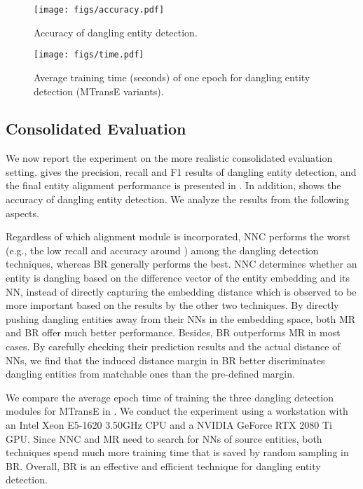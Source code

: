 \begin{figure}[t]
	\centering
	\texttt{[image: figs/accuracy.pdf]}
	\caption{Accuracy of dangling entity detection.}
	\label{fig:accuracy}
\end{figure}

\begin{figure}[t]
	\centering
	\texttt{[image: figs/time.pdf]}
	\caption{Average training time (seconds) of one epoch for dangling entity detection (MTransE variants).}
	\label{fig:time}
\end{figure}

\subsection{Consolidated Evaluation}\label{sec:consolidated}
We now report the experiment on the more realistic consolidated evaluation setting.
 gives the precision, recall and F1 results of dangling entity detection, and the final entity alignment performance is presented in . 
In addition,  shows the accuracy of dangling entity detection.
We analyze the results from the following aspects.

Regardless of which alignment module is incorporated,
NNC performs the worst (e.g., the low recall and accuracy around ) 
among the dangling detection techniques, whereas BR generally performs the best. 
NNC determines whether an entity is dangling based on the difference vector of the entity embedding and its NN, instead of directly capturing the embedding distance which is observed to be more important based on the results by the other two techniques.
By directly pushing dangling entities away from their NNs in the embedding space, both MR and BR offer much better performance. 
Besides, BR outperforms MR in most cases. 
By carefully checking their prediction results and the actual distance of NNs, we find that the induced distance margin in BR better discriminates dangling entities from matchable ones than the pre-defined margin.

We compare the average epoch time of training the three dangling detection modules for MTransE in . We conduct the experiment using a workstation with an Intel Xeon E5-1620 3.50GHz CPU and a NVIDIA GeForce RTX 2080 Ti GPU. 
Since NNC and MR need to search for NNs of source entities, both techniques spend much more training time 
that is saved by random sampling in BR. Overall, BR is an effective and efficient technique for dangling entity detection.

